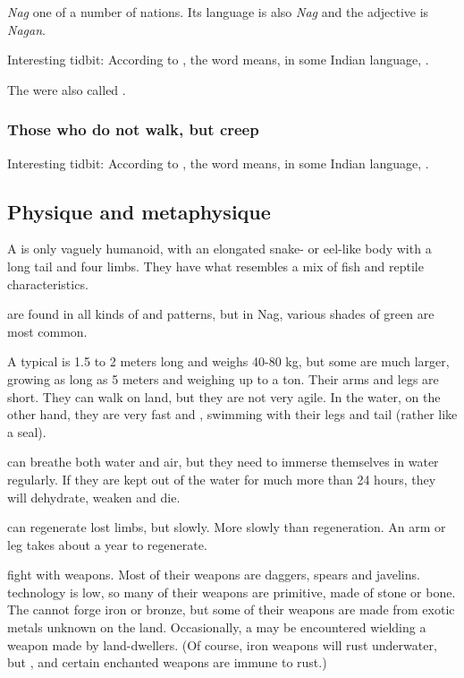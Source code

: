 \emph{Nag} one of a number of \naga{} nations. 
Its language is also \emph{Nag} and the adjective is \emph{Nagan}. 

Interesting tidbit: 
According to \DIBiggestSecret, the word  means, in some Indian language, . 

The \nagae were also called \quo{\ichthyans}. 





\subsubsection{Those who do not walk, but creep}
Interesting tidbit: 
According to \DIBiggestSecret, the word  means, in some Indian language, . 









\subsection{Physique and metaphysique}
A \naga{} is only vaguely humanoid, with an elongated snake- or eel-like body with a long tail and four limbs. 
They have what resembles a mix of fish and reptile characteristics. 

\Nagae{} are found in all kinds of \colours and patterns, but in Nag, various shades of green are most common. 

A typical \naga{} is 1.5 to 2 meters long and weighs 40-80 kg, but some are much larger, growing as long as 5 meters and weighing up to a ton. 
Their arms and legs are short. 
They can walk on land, but they are not very agile. 
In the water, on the other hand, they are very fast and \manoeuvrable, swimming with their legs and tail (rather like a seal). 

\Nagae{} can breathe both water and air, but they need to immerse themselves in water regularly. 
If they are kept out of the water for much more than 24 hours, they will dehydrate, weaken and die. 

\Nagae{} can regenerate lost limbs, but slowly. 
More slowly than \meccaran{} regeneration. 
An arm or leg takes about a year to regenerate. 

\Nagae{} fight with weapons. 
Most of their weapons are daggers, spears and javelins. 
\Naga{} technology is low, so many of their weapons are primitive, made of stone or bone. 
The \nagae{} cannot forge iron or bronze, but some of their weapons are made from exotic metals unknown on the land. 
Occasionally, a \naga{} may be encountered wielding a weapon made by land-dwellers. 
(Of course, iron weapons will rust underwater, but \dragonsteel, \truesilver{} and certain enchanted weapons are immune to rust.) 

